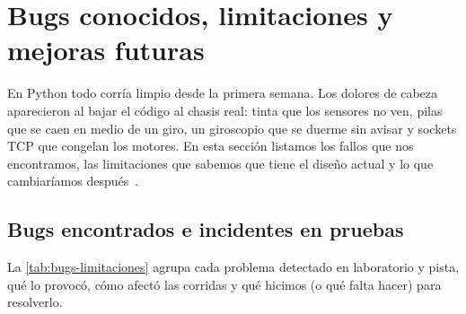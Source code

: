 \section{Bugs conocidos, limitaciones y mejoras futuras}
\label{sec:bugs-futuro}

En Python todo corría limpio desde la primera semana. Los dolores de cabeza aparecieron al bajar el código al chasis real: tinta que los sensores no ven, pilas que se caen en medio de un giro, un giroscopio que se duerme sin avisar y sockets TCP que congelan los motores. En esta sección listamos los fallos que nos encontramos, las limitaciones que sabemos que tiene el diseño actual y lo que cambiaríamos después~\cite{arquitectura2026doc,handoff2026doc,excel2026organizacion}.

\subsection{Bugs encontrados e incidentes en pruebas}
\label{subsec:catalogo-bugs}

La \cref{tab:bugs-limitaciones} agrupa cada problema detectado en laboratorio y pista, qué lo provocó, cómo afectó las corridas y qué hicimos (o qué falta hacer) para resolverlo.

